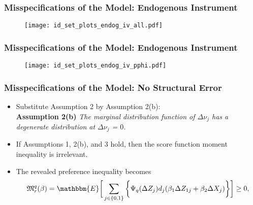 \documentclass[notes=show]{beamer}
\begin{document}
\begin{frame}
\frametitle{Misspecifications of the Model: Endogenous Instrument}

\begin{figure}[h!]
\centering \texttt{[image: id\_set\_plots\_endog\_iv\_all.pdf]}
\end{figure}

\end{frame}
\begin{frame}
\frametitle{Misspecifications of the Model: Endogenous Instrument}

\begin{figure}[h!]
\centering \texttt{[image: id\_set\_plots\_endog\_iv\_pphi.pdf]}
\end{figure}

\end{frame}
\begin{frame}
\frametitle{Misspecifications of the Model: No Structural Error}

\begin{itemize}
	\item Substitute Assumption 2 by Assumption 2(b):\\
	\bigskip
	\textbf{Assumption 2(b)} \textit{The marginal distribution function of $\Delta\nu_{j}$ has a degenerate distribution at $\Delta\nu_{j}$ = $0$.}
	\bigskip
	\item If Assumptions 1, 2(b), and 3 hold, then the score function moment inequality is irrelevant.
	\item The revealed preference inequality becomes
	\begin{align*}
	\mathfrak{M}^{q}_{r}(\beta)=\mathbbm{E}\bigg[\sum_{j\in\{0,1\}}\bigg\{\Psi_{q}(\Delta Z_{j})d_{j}(\beta_{1}\Delta Z_{1j}+\beta_{2}\Delta X_{j})\bigg\}\bigg]\geq 0,
	\end{align*}
\end{itemize}
\end{frame}
\end{document}
